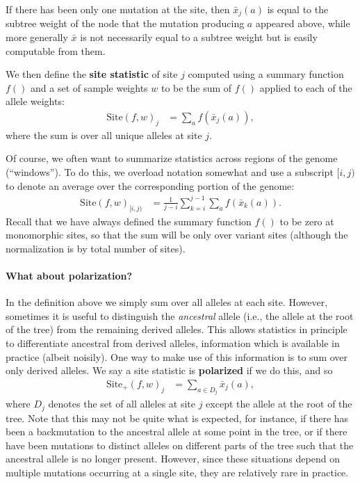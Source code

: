 \documentclass{article}
\newcommand{\site}{\mbox{Site}} %
\newcommand{\sitep}{\mbox{Site}_+} %
\newcommand{\iw}{w} %
\newcommand{\aw}{{\bar x}} %
\begin{document}
If there has been only one mutation at the site,
then $\aw_j(a)$ is equal to the subtree weight of the node that the mutation producing $a$
appeared above, 
while more generally $\aw$ is not necessarily equal to a subtree weight 
but is easily computable from them.

We then define the \textbf{site statistic} of site $j$ computed using a summary function $f()$
and a set of sample weights $\iw$
to be the sum of $f()$ applied to each of the allele weights:
\begin{align}
    \site(f, \iw)_j
    &=
    \sum_{a} f(\aw_j(a)) ,
\end{align}
where the sum is over all unique alleles at site $j$.

Of course, we often want to summarize statistics across regions of the genome (``windows'').
To do this, we overload notation somewhat and use a subscript $[i,j)$ to denote an average
over the corresponding portion of the genome:
\begin{align}
    \site(f, \iw)_{[i,j)}
    &=
    \frac{1}{j-i} \sum_{k=i}^{j-1} \sum_a f(\aw_k(a)) .
\end{align}
Recall that we have always defined the summary function $f()$ to be zero at monomorphic sites,
so that the sum will be only over variant sites
(although the normalization is by total number of sites).


\paragraph{What about polarization?}
In the definition above we simply sum over all alleles at each site.
However, sometimes it is useful to distinguish the \emph{ancestral} allele 
(i.e., the allele at the root of the tree) from the remaining derived alleles.
This allows statistics in principle to differentiate ancestral from derived alleles,
information which is available in practice (albeit noisily).
One way to make use of this information is to sum over only derived alleles.
We say a site statistic is \textbf{polarized} if we do this,
and so
\begin{align}
    \sitep(f, \iw)_j
    &=
    \sum_{a \in D_j} \aw_j(a) ,
\end{align}
where $D_j$ denotes the set of all alleles at site $j$ except the allele at the root of the tree.
Note that this may not be quite what is expected,
for instance, if there has been a backmutation to the ancestral allele at some point in the tree,
or if there have been mutations to distinct alleles on different parts of the tree
such that the ancestral allele is no longer present.
However, since these situations depend on multiple mutations occurring at a single site,
they are relatively rare in practice.
\end{document}
